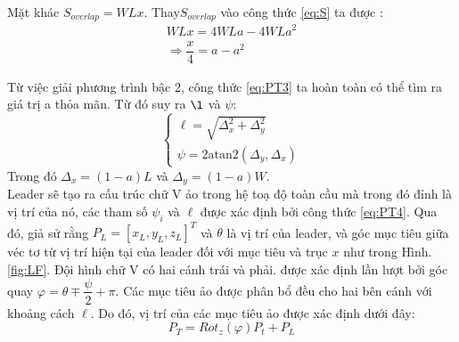 Mặt khác $S_{overlap} = WLx$. Thay$S_{overlap}$ vào công thức \ref{eq:S} ta được :
\begin{equation}
\begin{array}{c}
   WLx=4WLa-4WLa^{2}\\
   \Rightarrow\dfrac{x}{4}=a-a^{2}
   \end{array}
\label{eq:PT3}
\end{equation}

Từ việc giải phương trình bậc 2, công thức \ref{eq:PT3} ta hoàn toàn có thể tìm ra giá trị a thỏa mãn. Từ đó suy ra $\l$ và $\psi$:
\begin{equation}
  \left\{ \begin{array}{c}
    \ell=\sqrt{\Delta_{x}^2+\Delta_{y}^2}\\
    \psi=2\text{atan2}(\Delta_{y},\Delta_{x})
    \end{array}\right.
\label{eq:PT4}
\end{equation}
Trong đó $\Delta_{x}=(1-a)L$ và $\Delta_{y}=(1-a)W$.\\

Leader sẽ tạo ra cấu trúc chữ V ảo trong hệ toạ độ toàn cầu mà trong đó đỉnh là vị trí của nó, các tham số $\psi_i$ và $\ell$ được xác định bởi công thức \ref{eq:PT4}. Qua đó, giả sử rằng $P_L=[x_L, y_L, z_L]^T$ và $\theta$ là vị trí của leader, và góc mục tiêu giữa véc tơ từ vị trí hiện tại của leader đối với mục tiêu và trục $x$ như trong Hình.\ref{fig:LF}. Đội hình chữ V có hai cánh trái và phải. được xác định lần lượt bởi góc quay $\varphi=\theta\mp\dfrac{\psi}{2}+\pi$. Các mục tiêu ảo được phân bổ đều cho hai bên cánh với khoảng cách $\ell$. Do đó, vị trí của các mục tiêu ảo được xác định dưới đây:
\begin{equation}
    P_T=Rot_z(\varphi)P_{t}+P_{L}
\end{equation}

